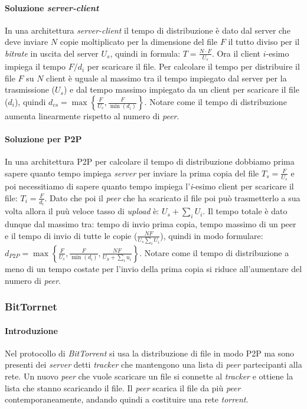         \paragraph{Soluzione \textit{server-client}} In una architettura \textit{server-client} il tempo di distribuzione è dato dal server che deve inviare $N$ copie moltiplicato per la dimensione del file $F$ il tutto diviso per il \textit{bitrate} in uscita del server $U_s$, quindi in formula: $T=\frac{N\cdot F}{U_s}$. Ora il client $i$-esimo impiega il tempo $F/d_i$ per scaricare il file. Per calcolare il tempo per distribuire il file $F$ su $N$ client è uguale al massimo tra il tempo impiegato dal server per la trasmissione ($U_s$) e dal tempo massimo impiegato da un client per scaricare il file ($d_i$), quindi $d_{cs} = \max\left\{\frac{F}{U_s}, \frac{F}{\min(d_i)}\right\}$. Notare come il tempo di distribuzione aumenta linearmente rispetto al numero di \textit{peer}.
        \paragraph{Soluzione per \Acrshort*{P2P}} In una architettura \Acrshort*{P2P} per calcolare il tempo di distribuzione dobbiamo prima sapere quanto tempo impiega \textit{server} per inviare la prima copia del file $ T_s = \frac{F}{U_s} $ e poi necessitiamo di sapere quanto tempo impiega l'\textit{i}-esimo client per scaricare il file: $T_i= \frac{F}{d_i} $. Dato che poi il \textit{peer} che ha scaricato il file poi può trasmetterlo a sua volta allora il puù veloce tasso di \textit{upload} è: $U_s+\sum_iU_i $. Il tempo totale è dato dunque dal massimo tra: tempo di invio prima copia, tempo massimo di un peer e il tempo di invio di tutte le copie ($\frac{NF}{U_s\sum_iU_i} $), quindi in modo formulare: $ d_{P2P}=\max\left\{\frac{F}{U_s}, \frac{F}{\min(d_i)}, \frac{NF}{U_S+\sum_iu_i}\right\} $. Notare come il tempo di distribuzione a meno di un tempo costate per l'invio della prima copia si riduce all'aumentare del numero di \textit{peer}.
        \subsubsection{BitTorrnet}
            \paragraph{Introduzione} Nel protocollo di \textit{BitTorrent} si usa la distribuzione di file in modo \Acrshort*{P2P} ma sono presenti dei \textit{server} detti \textit{tracker} che mantengono una lista di \textit{peer} partecipanti alla rete. Un nuovo \textit{peer} che vuole scaricare un file si connette al \textit{tracker} e ottiene la lista che stanno scaricando il file. Il \textit{peer} scarica il file da più \textit{peer} contemporaneamente, andando quindi a costituire una rete \textit{torrent}.
